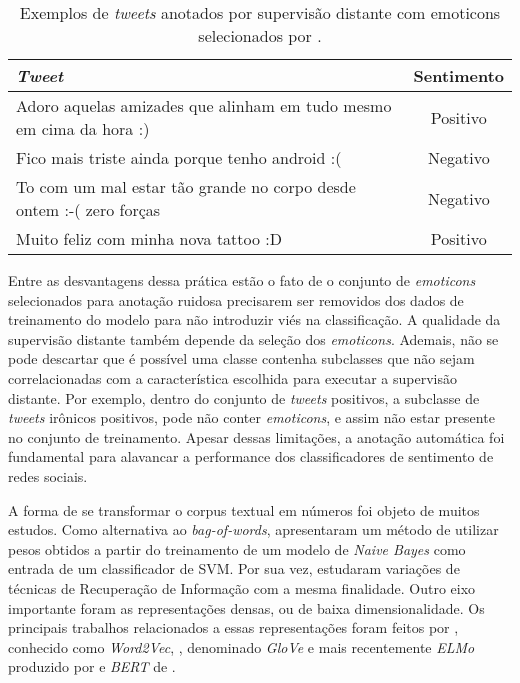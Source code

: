 \begin{table}[h]
    \begin{center}
        \begin{tabular}{| p{10cm} | c |}
        \hline
        \textbf{\textit{Tweet}} & \textbf{Sentimento} \\ \hline
        Adoro aquelas amizades que alinham em tudo mesmo em cima da hora :) & Positivo \\ \hline
        Fico mais triste ainda porque tenho android :( & Negativo\\ \hline
        To com um mal estar tão grande no corpo desde ontem :-( zero forças & Negativo\\ \hline
        Muito feliz com minha nova tattoo :D & Positivo \\ \hline
        \end{tabular}
        \caption{Exemplos de \textit{tweets} anotados por supervisão distante
        com emoticons selecionados por \citet{go09}.}
        \label{tab:supervision_tweets}
    \end{center}
\end{table}

Entre as desvantagens dessa prática estão o fato de o conjunto de
\textit{emoticons} selecionados para anotação ruidosa precisarem ser removidos
dos dados de treinamento do modelo para não introduzir viés na classificação.
A qualidade da supervisão distante também depende da seleção dos
\textit{emoticons}.
Ademais, não se pode descartar que é possível uma classe contenha subclasses que
não sejam correlacionadas com a característica escolhida para executar a
supervisão distante.
Por exemplo, dentro do conjunto de \textit{tweets} positivos, a subclasse de
\textit{tweets} irônicos positivos, pode não conter \textit{emoticons}, e assim
não estar presente no conjunto de treinamento.
Apesar dessas limitações, a anotação automática foi fundamental para alavancar
a performance dos classificadores de sentimento de redes sociais.


A forma de se transformar o corpus textual em números foi objeto de muitos
estudos.
Como alternativa ao \textit{bag-of-words}, \citet{wang12} apresentaram um método
de utilizar pesos obtidos a partir do treinamento de um modelo de
\textit{Naive Bayes} como entrada de um classificador de SVM.
Por sua vez, \citet{paltoglou10} estudaram variações de técnicas de Recuperação
de Informação com a mesma finalidade.
Outro eixo importante foram as representações densas, ou de baixa
dimensionalidade.
Os principais trabalhos relacionados a essas representações foram feitos por
\citet{mikolov13}, conhecido como \textit{Word2Vec}, \citet{pennington14},
denominado \textit{GloVe} e mais recentemente \textit{ELMo} produzido por
\citet{peters18} e \textit{BERT} de \citet{devlin18}.

